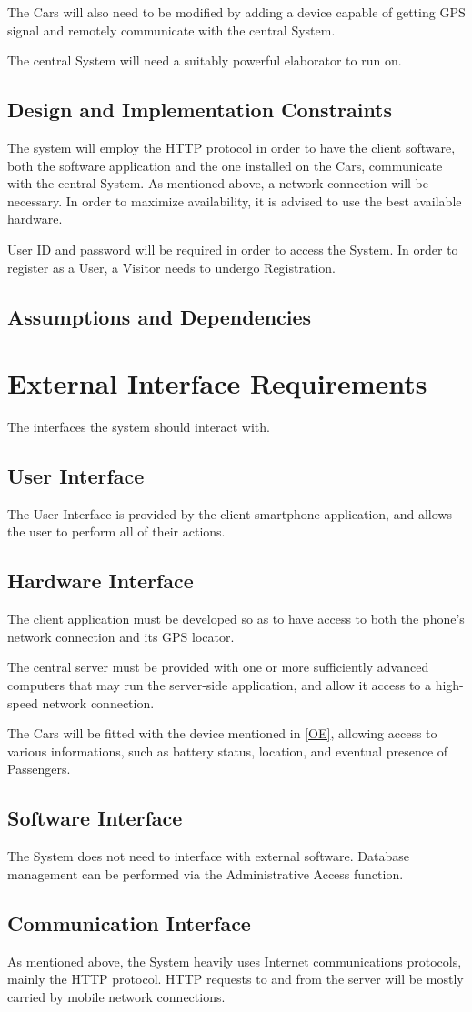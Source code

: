 The Cars will also need to be modified by adding a device capable of getting GPS signal and remotely communicate with the central System.

The central System will need a suitably powerful elaborator to run on.

\subsection{Design and Implementation Constraints}
The system will employ the HTTP protocol in order to have the client software, both the software application and the one installed on the Cars, communicate with the central System. As mentioned above, a network connection will be necessary. In order to maximize availability, it is advised to use the best available hardware.

User ID and password will be required in order to access the System. In order to register as a User, a Visitor needs to undergo Registration. 

\subsection{Assumptions and Dependencies}


\clearpage\section{External Interface Requirements}
The interfaces the system should interact with.
\subsection{User Interface}
The User Interface is provided by the client smartphone application, and allows the user to perform all of their actions.
\subsection{Hardware Interface}
The client application must be developed so as to have access to both the phone's network connection and its GPS locator.

The central server must be provided with one or more sufficiently advanced computers that may run the server-side application, and allow it access to a high-speed network connection.

The Cars will be fitted with the device mentioned in \ref{OE}, allowing access to various informations, such as battery status, location, and eventual presence of Passengers.
\subsection{Software Interface}
The System does not need to interface with external software. Database management can be performed via the Administrative Access function.
\subsection{Communication Interface}
As mentioned above, the System heavily uses Internet communications protocols, mainly the HTTP protocol. HTTP requests to and from the server will be mostly carried by mobile network connections.